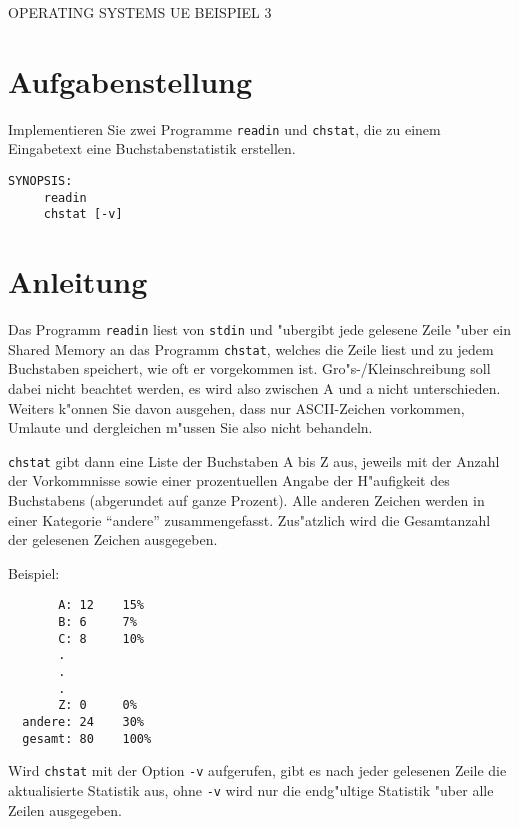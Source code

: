 \documentclass{article}
\begin{document}
\begin{center}
\begin{Large}
OPERATING SYSTEMS UE BEISPIEL 3
\end{Large}
\end{center}




\section*{Aufgabenstellung}

Implementieren Sie zwei Programme {\tt readin} und {\tt chstat}, die
zu einem Eingabetext eine Buchstabenstatistik erstellen.

\begin{verbatim}
SYNOPSIS:
     readin
     chstat [-v]
\end{verbatim} 




\section*{Anleitung}

Das Programm {\tt readin} liest von {\tt stdin} und "ubergibt jede
gelesene Zeile "uber ein Shared Memory an das Programm {\tt chstat},
welches die Zeile liest und zu jedem Buchstaben speichert, wie oft er
vorgekommen ist. Gro"s-/Kleinschreibung soll dabei nicht beachtet
werden, es wird also zwischen A und a nicht unterschieden. Weiters
k"onnen Sie davon ausgehen, dass nur ASCII-Zeichen vorkommen, Umlaute
und dergleichen m"ussen Sie also nicht behandeln.

{\tt chstat} gibt dann eine Liste der Buchstaben A bis Z aus, jeweils
mit der Anzahl der Vorkommnisse sowie einer prozentuellen Angabe der
H"aufigkeit des Buchstabens (abgerundet auf ganze Prozent). Alle
anderen Zeichen werden in einer Kategorie ``andere''
zusammengefasst. Zus"atzlich wird die Gesamtanzahl der gelesenen
Zeichen ausgegeben.

Beispiel:
\begin{verbatim}
       A: 12    15%
       B: 6     7%
       C: 8     10%
       .
       .
       .
       Z: 0     0%
  andere: 24    30%
  gesamt: 80    100%
\end{verbatim}

Wird {\tt chstat} mit der Option {\tt -v} aufgerufen, gibt es nach
jeder gelesenen Zeile die aktualisierte Statistik aus, ohne {\tt -v}
wird nur die endg"ultige Statistik "uber alle Zeilen ausgegeben.
\end{document}
